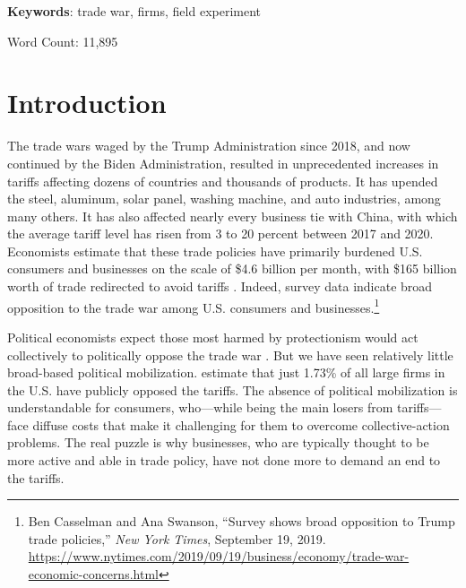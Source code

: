 \documentclass{article}
\begin{document}
\textbf{Keywords}: trade war, firms, field experiment

\bigskip
\begin{center}
    Word Count: 11,895
\end{center}


\doublespacing

\newpage

 \setcounter{page}{1}

\section{Introduction}

The trade wars waged by the Trump Administration since 2018, and now continued by the Biden Administration, resulted in unprecedented increases in tariffs affecting dozens of countries and thousands of products. It has upended the steel, aluminum, solar panel, washing machine, and auto industries, among many others. It has also affected nearly every business tie with China, with which the average tariff level has risen from 3 to 20 percent between 2017 and 2020. Economists estimate that these trade policies have primarily burdened U.S. consumers and businesses on the scale of \$4.6 billion per month, with \$165 billion worth of trade redirected to avoid tariffs \citep{amiti2019impact}. Indeed, survey data indicate broad opposition to the trade war among U.S. consumers and businesses.\footnote{Ben Casselman and Ana Swanson, ``Survey shows broad opposition to Trump trade policies,'' \textit{New York Times}, September 19, 2019. \url{https://www.nytimes.com/2019/09/19/business/economy/trade-war-economic-concerns.html}}

Political economists expect those most harmed by protectionism would act collectively to politically oppose the trade war \citep{milner1999political}. But we have seen relatively little broad-based political mobilization. \citet{zhu2021firms} estimate that just 1.73\% of all large firms in the U.S. have publicly opposed the tariffs. The absence of political mobilization is understandable for consumers, who---while being the main losers from tariffs---face diffuse costs that make it challenging for them to overcome collective-action problems. The real puzzle is why businesses, who are typically thought to be more active and able in trade policy, have not done more to demand an end to the tariffs.
\end{document}
